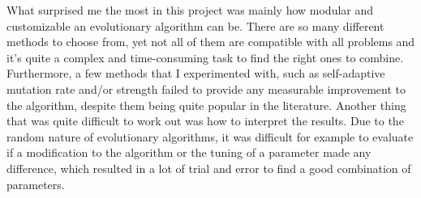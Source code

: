 \documentclass[a4paper,10pt]{article}
\newcommand{\ReplaceMe}[1]{{\color{blue}#1}}
\begin{document}
What surprised me the most in this project was mainly how modular and customizable an evolutionary algorithm can be. There are so many different methods to choose from, yet not all of them are compatible with all problems and it's quite a complex and time-consuming task to find the right ones to combine. Furthermore, a few methods that I experimented with, such as self-adaptive mutation rate and/or strength failed to provide any measurable improvement to the algorithm, despite them being quite popular in the literature. Another thing that was quite difficult to work out was how to interpret the results. Due to the random nature of evolutionary algorithms, it was difficult for example to evaluate if a modification to the algorithm or the tuning of a parameter made any difference, which resulted in a lot of trial and error to find a good combination of parameters.

%



\end{document}
